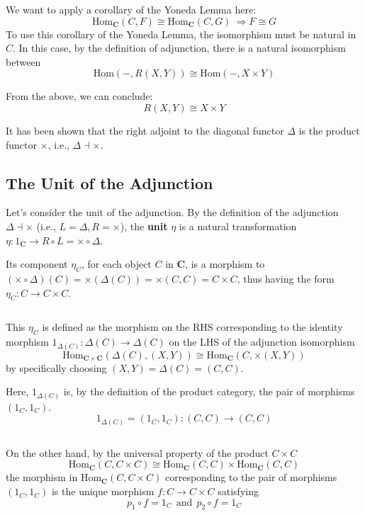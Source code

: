 \documentclass[uplatex,a4j,12pt,dvipdfmx]{jsarticle}
\begin{document}
We want to apply a corollary of the Yoneda Lemma here:
$$
	\mathrm{Hom}_{\mathbf{C}}(C, F)
	\cong
	\mathrm{Hom}_{\mathbf{C}}(C, G)
	\ \Rightarrow
	F \cong G
$$
To use this corollary of the Yoneda Lemma, the isomorphism must be natural in $C$.
In this case, by the definition of adjunction,
there is a natural isomorphism between
$$
	\mathrm{Hom}(-, R(X,Y))
	\cong
	\mathrm{Hom}(-, X \times Y)
$$

From the above, we can conclude:
$$
	R(X,Y)
	\cong
	X \times Y
$$

It has been shown that the right adjoint to the diagonal functor $\Delta$ is the product functor $\times$, i.e., $\Delta \dashv \times$.

\subsection{The Unit of the Adjunction}

Let's consider the unit of the adjunction.
By the definition of the adjunction $\Delta \dashv \times$ (i.e., $L=\Delta, R= \times$), the
\textbf{unit} $\eta$ is a natural transformation
$\eta : 1_{\mathbf{C}} \to R \circ L = \times \circ \Delta$.

Its component $\eta_{C}$, for each object $C$ in $\mathbf{C}$,
is a morphism to $(\times \circ \Delta)(C) = \times (\Delta (C)) = \times (C,C) = C \times C$,
thus having the form
$\eta_{C} : C \to C \times C$.

${}$

This $\eta_{C}$ is defined as the morphism on the RHS corresponding to the
identity morphism $1_{\Delta(C)} : \Delta(C) \to \Delta(C)$ on the LHS
of the adjunction isomorphism
$$
	\mathrm{Hom}_{\mathbf{C} \times \mathbf{C}}(\Delta(C), (X,Y)) \cong \mathrm{Hom}_{\mathbf{C}}(C,\times (X,Y))
$$
by specifically choosing $(X,Y) = \Delta (C) = (C,C)$.

Here, $1_{\Delta(C)}$
is, by the definition of the product category, the pair of morphisms
$(1_{C}, 1_{C})$.
$$
	1_{\Delta(C)} = (1_{C}, 1_{C}) : (C,C) \to (C,C)
$$

${}$

On the other hand, by the universal property of the product $C \times C$
$$
	\mathrm{Hom}_{\mathbf{C}}(C, C \times C)
	\cong
	\mathrm{Hom}_{\mathbf{C}}(C, C)
	\times
	\mathrm{Hom}_{\mathbf{C}}(C, C)
$$
the morphism in $\mathrm{Hom}_{\mathbf{C}}(C, C \times C)$
corresponding to the pair of morphisms $(1_{C}, 1_{C})$
is the unique morphism $f: C \to C \times C$ satisfying
$$
	p_{1} \circ f = 1_{C} \ \ \text{and} \ \ p_{2} \circ f = 1_{C}
$$
\end{document}
